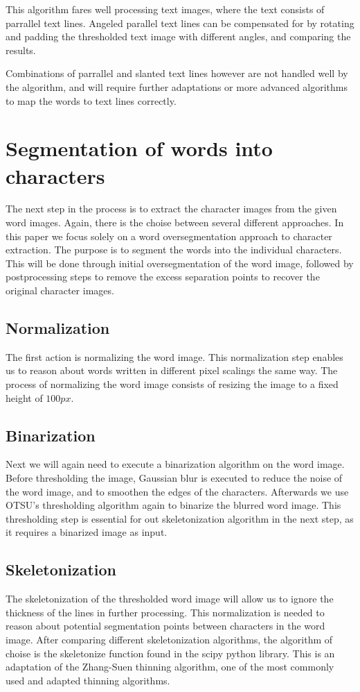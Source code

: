 \documentclass{article}
\begin{document}
This algorithm fares well processing text images, where the text consists of parrallel text lines.
Angeled parallel text lines can be compensated for by rotating and padding the thresholded text image with different angles, and comparing the results.

Combinations of parrallel and slanted text lines however are not handled well by the algorithm, and will require further adaptations or more advanced algorithms to map the words to text lines correctly.


\section{Segmentation of words into characters}
\label{sec:segword}

The next step in the process is to extract the character images from the given word images.
Again, there is the choise between several different approaches.
In this paper we focus solely on a word oversegmentation approach to character extraction.
The purpose is to segment the words into the individual characters.
This will be done through initial oversegmentation of the word image, followed by postprocessing steps to remove the excess separation points to recover the original character images.

\subsection{Normalization} %
The first action is normalizing the word image.
This normalization step enables us to reason about words written in different pixel scalings the same way.
The process of normalizing the word image consists of resizing the image to a fixed height of $100px$.

\subsection{Binarization}
Next we will again need to execute a binarization algorithm on the word image.
Before thresholding the image, Gaussian blur is executed to reduce the noise of the word image, and to smoothen the edges of the characters.
Afterwards we use OTSU's thresholding algorithm again to binarize the blurred word image.
This thresholding step is essential for out skeletonization algorithm in the next step, as it requires a binarized image as input.

\subsection{Skeletonization}
The skeletonization of the thresholded word image will allow us to ignore the thickness of the lines in further processing. 
This normalization is needed to reason about potential segmentation points between characters in the word image.
After comparing different skeletonization algorithms, the algorithm of choise is the skeletonize function found in the scipy python library.
This is an adaptation of the Zhang-Suen thinning algorithm, one of the most commonly used and adapted thinning algorithms.
\citep{zsthinning}
\end{document}
